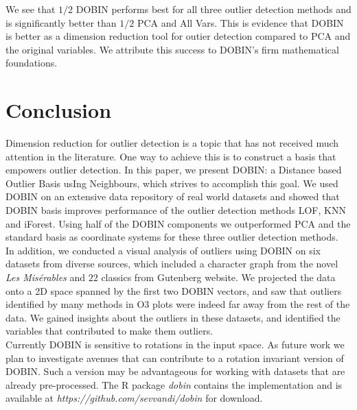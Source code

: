 \documentclass[a4paper,11pt]{article}
\begin{document}
We see that $1/2$ DOBIN performs best for all three outlier detection methods and is significantly better than $1/2$ PCA and All Vars. This is evidence that DOBIN is better as a dimension reduction tool for outier detection compared to PCA and the original variables. We attribute this success to DOBIN's firm mathematical foundations. 

\section{Conclusion}
Dimension reduction for outlier detection is a topic that has not received much attention in the literature. One way to achieve this is to construct a basis that empowers outlier detection. In this paper, we present DOBIN: a Distance based Outlier Basis usIng Neighbours, which strives to accomplish this goal. We used DOBIN on an extensive data repository of real world datasets and showed that DOBIN basis improves performance of the outlier detection methods LOF, KNN and iForest. Using half of the DOBIN components we outperformed PCA and the standard basis as coordinate systems for these three outlier detection methods. \\

In addition, we conducted a visual analysis of outliers using DOBIN on six datasets from diverse sources, which included a character graph from the novel  \textit{Les Mis\'erables} and $22$ classics from Gutenberg website. We projected the data onto a 2D space spanned by the first two DOBIN vectors, and saw that outliers identified by many methods in O3 plots were indeed far away from the rest of the data.  We gained insights about the outliers in these datasets, and identified the variables that contributed to make them outliers.  \\

Currently DOBIN is sensitive to rotations in the input space. As future work we plan to investigate avenues that can contribute to a rotation invariant version of DOBIN. Such a version may be advantageous for working with datasets that are already pre-processed. The R package \textit{dobin} contains the implementation and is available at \textit{https://github.com/sevvandi/dobin} for download. 


\end{document}

